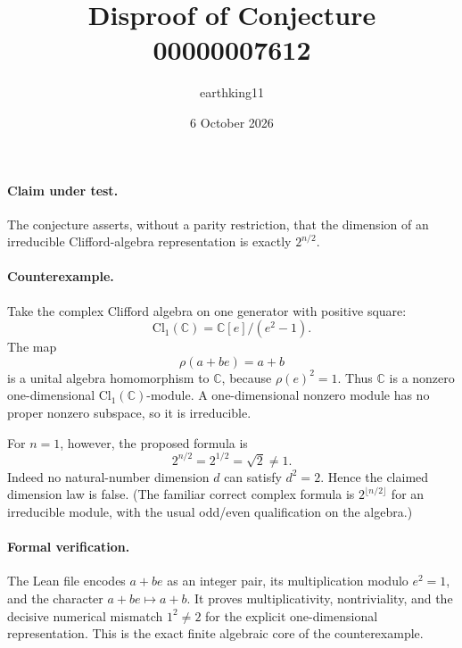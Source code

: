 \documentclass[11pt]{article}
\title{Disproof of Conjecture 00000007612}
\author{earthking11}
\date{6 October 2026}
\begin{document}
\maketitle

\paragraph{Claim under test.}
The conjecture asserts, without a parity restriction, that the dimension of
an irreducible Clifford-algebra representation is exactly $2^{n/2}$.

\paragraph{Counterexample.}
Take the complex Clifford algebra on one generator with positive square:
\[
  \mathrm{Cl}_1(\mathbb C)=\mathbb C[e]/(e^2-1).
\]
The map
\[
  \rho(a+be)=a+b
\]
is a unital algebra homomorphism to $\mathbb C$, because
$\rho(e)^2=1$.  Thus $\mathbb C$ is a nonzero one-dimensional
$\mathrm{Cl}_1(\mathbb C)$-module.  A one-dimensional nonzero module has no
proper nonzero subspace, so it is irreducible.

For $n=1$, however, the proposed formula is
\[
  2^{n/2}=2^{1/2}=\sqrt 2\ne 1.
\]
Indeed no natural-number dimension $d$ can satisfy $d^2=2$.  Hence the
claimed dimension law is false.  (The familiar correct complex formula is
$2^{\lfloor n/2\rfloor}$ for an irreducible module, with the usual odd/even
qualification on the algebra.)

\paragraph{Formal verification.}
The Lean file encodes $a+be$ as an integer pair, its multiplication modulo
$e^2=1$, and the character $a+be\mapsto a+b$.  It proves multiplicativity,
nontriviality, and the decisive numerical mismatch $1^2\ne2$ for the
explicit one-dimensional representation.  This is the exact finite
algebraic core of the counterexample.
\end{document}
